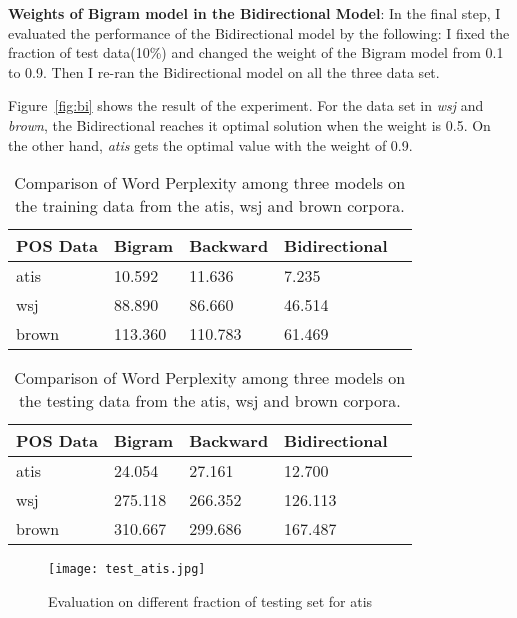 \documentclass[10pt]{article}
\begin{document}
\textbf{Weights of Bigram model in the Bidirectional Model}: In the final step, I evaluated the performance of the Bidirectional model by the following: I fixed the fraction of test data(10\%) and changed the weight of the Bigram model from 0.1 to 0.9. Then I re-ran the Bidirectional model on all the three data set.

Figure~\ref{fig:bi} shows the result of the experiment. For the data set in \emph{wsj} and \emph{brown}, the Bidirectional reaches it optimal solution when the weight is 0.5. On the other hand, \emph{atis} gets the optimal value with the weight of 0.9.



\begin{table}
\begin{center}
\begin{tabular}{|l|l|l|l|l|}  \hline
POS Data    & Bigram & Backward & Bidirectional \\ \hline
atis        & 10.592 & 11.636 & 7.235  \\ \hline
wsj         & 88.890 & 86.660 & 46.514  \\  \hline
brown       & 113.360 & 110.783 & 61.469  \\  \hline
\end{tabular}
\caption{\small Comparison of Word Perplexity among three models on the training data from the atis, wsj and brown corpora.}\label{table:train}
\end{center}
\end{table}

\begin{table}
\begin{center}
\begin{tabular}{|l|l|l|l|l|}  \hline
POS Data    & Bigram & Backward & Bidirectional \\ \hline
atis        & 24.054 & 27.161 & 12.700  \\ \hline
wsj         & 275.118 & 266.352 & 126.113  \\  \hline
brown       & 310.667 & 299.686 & 167.487  \\  \hline
\end{tabular}
\caption{\small Comparison of Word Perplexity among three models on the testing data from the atis, wsj and brown corpora.}\label{table:test}
\end{center}
\end{table}



\begin{figure}
\centering
\texttt{[image: test\_atis.jpg]}
\caption{Evaluation on different fraction of testing set for atis}\label{fig:test1}
\end{figure}
\end{document}
